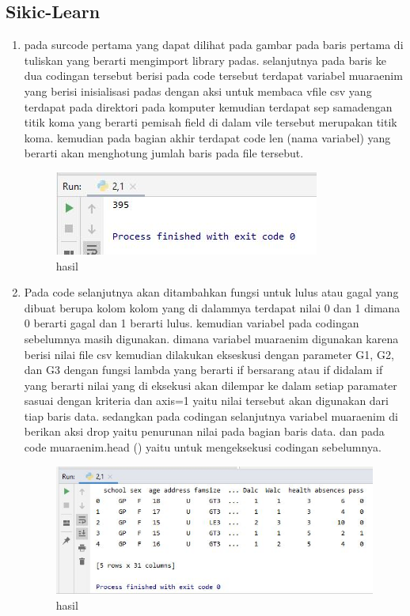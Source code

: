 \subsection{Sikic-Learn}
\begin{enumerate}
\item pada surcode pertama yang dapat dilihat pada gambar pada baris pertama di tuliskan yang berarti mengimport library padas. selanjutnya pada baris ke dua codingan tersebut berisi pada code tersebut terdapat variabel muaraenim yang berisi inisialisasi padas dengan aksi untuk membaca vfile csv yang terdapat pada direktori pada komputer kemudian terdapat sep samadengan titik koma yang berarti pemisah field di dalam vile tersebut merupakan titik koma. kemudian pada bagian akhir terdapat code len (nama variabel) yang berarti akan menghotung jumlah baris pada file tersebut.

\begin{figure}[ht]
\centering
\includegraphics[scale=0.5]{figures/1174042/chapter2/2,1.JPG}
\caption{hasil}
\label{contoh}
\end{figure}

\item Pada code selanjutnya akan ditambahkan fungsi untuk lulus atau gagal yang dibuat berupa kolom kolom yang di dalammya terdapat nilai 0 dan 1 dimana 0 berarti gagal dan 1 berarti lulus. kemudian variabel pada codingan sebelumnya masih digunakan. dimana variabel muaraenim digunakan karena berisi nilai file csv kemudian dilakukan ekseskusi dengan parameter G1, G2, dan G3 dengan fungsi lambda yang berarti if bersarang atau if didalam if yang berarti nilai yang di eksekusi akan dilempar ke dalam setiap paramater sasuai dengan kriteria dan axis=1 yaitu nilai tersebut akan digunakan dari tiap baris data. sedangkan pada codingan selanjutnya variabel muaraenim di berikan aksi drop yaitu penurunan nilai pada bagian baris data. dan pada code muaraenim.head () yaitu untuk mengeksekusi codingan sebelumnya.

\begin{figure}[ht]
\centering
\includegraphics[scale=0.5]{figures/1174042/chapter2/2,2.JPG}
\caption{hasil}
\label{contoh}
\end{figure}


\end{enumerate}
